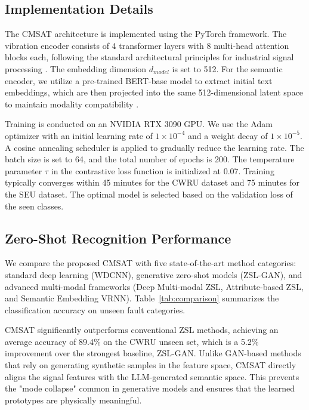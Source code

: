 \subsection{Implementation Details}
The CMSAT architecture is implemented using the PyTorch framework. The vibration encoder consists of 4 transformer layers with 8 multi-head attention blocks each, following the standard architectural principles for industrial signal processing \cite{key_transformer_base}. The embedding dimension $d_{model}$ is set to 512. For the semantic encoder, we utilize a pre-trained BERT-base model to extract initial text embeddings, which are then projected into the same 512-dimensional latent space to maintain modality compatibility \cite{key_bert_embedding}.

Training is conducted on an NVIDIA RTX 3090 GPU. We use the Adam optimizer with an initial learning rate of $1 \times 10^{-4}$ and a weight decay of $1 \times 10^{-5}$. A cosine annealing scheduler is applied to gradually reduce the learning rate. The batch size is set to 64, and the total number of epochs is 200. The temperature parameter $\tau$ in the contrastive loss function is initialized at 0.07. Training typically converges within 45 minutes for the CWRU dataset and 75 minutes for the SEU dataset. The optimal model is selected based on the validation loss of the seen classes.

\subsection{Zero-Shot Recognition Performance}
We compare the proposed CMSAT with five state-of-the-art method categories: standard deep learning (WDCNN), generative zero-shot models (ZSL-GAN), and advanced multi-modal frameworks (Deep Multi-modal ZSL, Attribute-based ZSL, and Semantic Embedding VRNN). Table~\ref{tab:comparison} summarizes the classification accuracy on unseen fault categories.

CMSAT significantly outperforms conventional ZSL methods, achieving an average accuracy of 89.4\% on the CWRU unseen set, which is a 5.2\% improvement over the strongest baseline, ZSL-GAN. Unlike GAN-based methods that rely on generating synthetic samples in the feature space, CMSAT directly aligns the signal features with the LLM-generated semantic space. This prevents the "mode collapse" common in generative models and ensures that the learned prototypes are physically meaningful.

